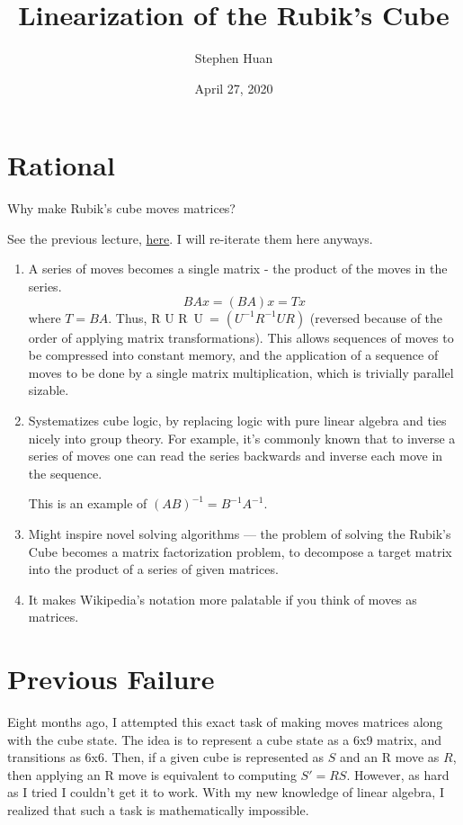 \documentclass[11pt, oneside]{article}
\title{Linearization of the Rubik's Cube}
\author{Stephen Huan}
\date{April 27, 2020}
\newcommand{\dash}{\textquotesingle}
\theoremstyle{plain}
\begin{document}
\maketitle

\section{Rational}
Why make Rubik's cube moves matrices?

See the previous lecture,
\href{https://activities.tjhsst.edu/cubing/static/pdfs/Matricization/matrix.pdf}{here}.
I will re-iterate them here anyways.
\begin{enumerate}
  \item A series of moves becomes a single matrix - the product of the
    moves in the series. \[ BAx = (BA)x = Tx \] where \( T = BA \). Thus,
    R U R\dash \ U\dash \ = \( (U^{-1} R^{-1} U R) \) (reversed because of
    the order of applying matrix transformations). This allows sequences of
    moves to be compressed into constant memory, and the application of a
    sequence of moves to be done by a single matrix multiplication, which
    is trivially parallel sizable.

  \item Systematizes cube logic, by replacing logic with pure linear algebra
    and ties nicely into group theory. For example, it's commonly known that
    to inverse a series of moves one can read the series backwards and inverse
    each move in the sequence.

    This is an example of \( (AB)^{-1} = B^{-1}A^{-1} \).

  \item Might inspire novel solving algorithms --- the problem of solving
    the Rubik's Cube becomes a matrix factorization problem, to decompose
    a target matrix into the product of a series of given matrices.

  \item It makes Wikipedia's notation
    more palatable if you think of moves as matrices.
\end{enumerate}

\section{Previous Failure}
Eight months ago, I attempted this exact task of making moves matrices along
with the cube state. The idea is to represent a cube state as a 6x9 matrix,
and transitions as 6x6. Then, if a given cube is represented as \( S \) and
an R move as \( R \), then applying an R move is equivalent to computing \(
S' = R S \). However, as hard as I tried I couldn't get it to work. With my
new knowledge of linear algebra, I realized that such a task is mathematically
impossible.
\end{document}
